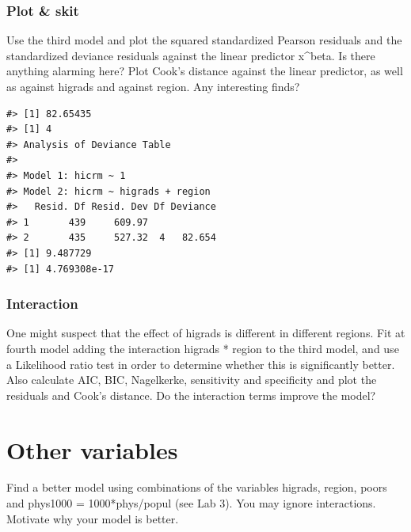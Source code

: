\documentclass[a4paper]{article}
\begin{document}
\subsubsection{Plot \& skit}\label{plot-skit}

Use the third model and plot the squared standardized Pearson residuals
and the standardized deviance residuals against the linear predictor
x\^{}beta. Is there anything alarming here? Plot Cook's distance against
the linear predictor, as well as against higrads and against region. Any
interesting finds?

\begin{verbatim}
#> [1] 82.65435
#> [1] 4
#> Analysis of Deviance Table
#> 
#> Model 1: hicrm ~ 1
#> Model 2: hicrm ~ higrads + region
#>   Resid. Df Resid. Dev Df Deviance
#> 1       439     609.97            
#> 2       435     527.32  4   82.654
#> [1] 9.487729
#> [1] 4.769308e-17
\end{verbatim}

\subsubsection{Interaction}\label{interaction}

One might suspect that the effect of higrads is different in different
regions. Fit at fourth model adding the interaction higrads * region to
the third model, and use a Likelihood ratio test in order to determine
whether this is significantly better. Also calculate AIC, BIC,
Nagelkerke, sensitivity and specificity and plot the residuals and
Cook's distance. Do the interaction terms improve the model?

\section{Other variables}\label{other-variables}

Find a better model using combinations of the variables higrads, region,
poors and phys1000 = 1000*phys/popul (see Lab 3). You may ignore
interactions. Motivate why your model is better.
\end{document}
